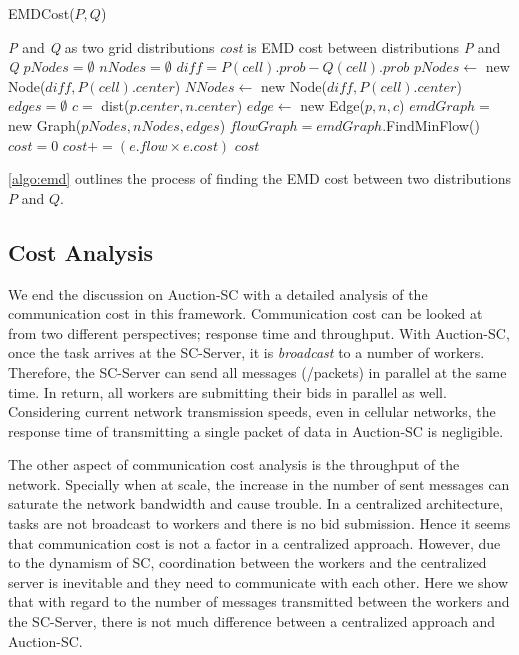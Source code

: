 \begin{algorithm}[h]
\caption{EMDCost($P, Q$)}
\label{algo:emd}
\begin{algorithmic}[1]
\REQUIRE \emph{P} and \emph{Q} as two grid distributions
\ENSURE \emph{cost} is EMD cost between distributions \emph{P} and \emph{Q}
\STATE $pNodes = \emptyset$
\STATE $nNodes = \emptyset$
	\STATE $diff = P(cell).prob - Q(cell).prob$
		\STATE $pNodes \leftarrow$ new Node($diff, P(cell).center$)
	\ELSE
		\STATE $NNodes \leftarrow$ new Node($diff, P(cell).center$)
	\ENDIF
\ENDFOR
\STATE $edges = \emptyset$
		\STATE $c =$ dist($p.center, n.center$)
		\STATE $edge \leftarrow$ new Edge($p, n, c$)
	\ENDFOR
\ENDFOR
\STATE $emdGraph =$ new Graph($pNodes, nNodes, edges$)
\STATE $flowGraph = emdGraph$.FindMinFlow()
\STATE $cost = 0$
	\STATE $cost += (e.flow \times e.cost)$
\ENDFOR
\RETURN $cost$
\end{algorithmic}
\end{algorithm}

\cref{algo:emd} outlines the process of finding the EMD cost between two distributions $P$ and $Q$. 

\subsection{Cost Analysis}

We end the discussion on Auction-SC with a detailed analysis of the communication cost in this framework. Communication cost can be looked at from two different perspectives; response time and throughput. With Auction-SC, once the task arrives at the SC-Server, it is \textit{broadcast} to a number of workers. Therefore, the SC-Server can send all messages (/packets) in parallel at the same time. In return, all workers are submitting their bids in parallel as well. Considering current network transmission speeds, even in cellular networks, the response time of transmitting a single packet of data in Auction-SC is negligible.

The other aspect of communication cost analysis is the throughput of the network. Specially when at scale, the increase in the number of sent messages can saturate the network bandwidth and cause trouble. In a centralized architecture, tasks are not broadcast to workers and there is no bid submission. Hence it seems that communication cost is not a factor in a centralized approach. However, due to the dynamism of SC, coordination between the workers and the centralized server is inevitable and they need to communicate with each other. Here we show that with regard to the number of messages transmitted between the workers and the SC-Server, there is not much difference between a centralized approach and Auction-SC.

